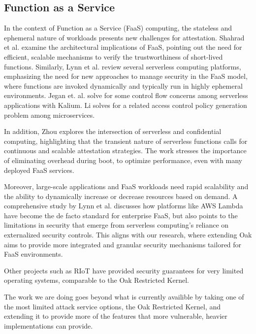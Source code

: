 \subsection{Function as a Service}

In the context of Function as a Service (FaaS) computing, the stateless and ephemeral nature of workloads presents new challenges for attestation.
Shahrad et al. \cite{shahrad_architectural_2019} examine the architectural implications of FaaS, pointing out the need for efficient, scalable mechanisms to verify the trustworthiness of short-lived functions. Similarly, Lynn et al. \cite{lynn_preliminary_2017} review several serverless computing platforms, emphasizing the need for new approaches to manage security in the FaaS model, where functions are invoked dynamically and typically run in highly ephemeral environments. Jegan et. al. \cite{jegan_guarding_nodate} solve for some control flow concerns among serverless applications with Kalium. Li \cite{li_automatic_nodate} solves for a related access control policy generation problem among microservices.


In addition, Zhou \cite{zhao_reusable_nodate} explores the intersection of serverless and confidential computing, highlighting that the transient nature of serverless functions calls for continuous and scalable attestation strategies. The work stresses the importance of 
eliminating overhead during boot, to optimize performance, even with many deployed FaaS services.

Moreover, large-scale applications and FaaS workloads need rapid scalability and the ability to dynamically increase or decrease resources based on demand. A comprehensive study by Lynn et al. \cite{lynn_preliminary_2017} discusses how platforms like AWS Lambda have become the de facto standard for enterprise FaaS, but also points to the limitations in security that emerge from serverless computing’s reliance on externalized security controls. This aligns with our research, where extending Oak aims to provide more integrated and granular security mechanisms tailored for FaaS environments.

Other projects such as RIoT \cite{england_foundation_nodate} have provided security guarantees for very limited operating systems, comparable to the Oak Restricted Kernel.

The work we are doing goes beyond what is currently availible by taking one of the most limited attack service options, the Oak Restricted Kernel, and extending it to provide more of the features that more vulnerable, heavier implementations can provide.

